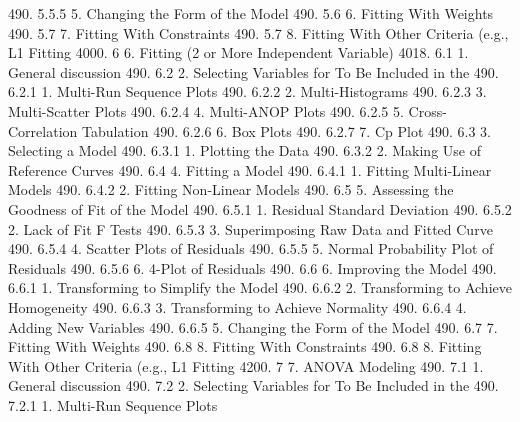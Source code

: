 490.      5.5.5                       5. Changing the Form of the Model
490.      5.6                   6. Fitting With Weights
490.      5.7                   7. Fitting With Constraints
490.      5.7                   8. Fitting With Other Criteria (e.g., L1 Fitting
4000.     6               6. Fitting (2 or More Independent Variable)
4018.     6.1                   1. General discussion
490.      6.2                   2. Selecting Variables for To Be Included in the
490.      6.2.1                       1. Multi-Run Sequence Plots
490.      6.2.2                       2. Multi-Histograms
490.      6.2.3                       3. Multi-Scatter Plots
490.      6.2.4                       4. Multi-ANOP Plots
490.      6.2.5                       5. Cross-Correlation Tabulation
490.      6.2.6                       6. Box Plots
490.      6.2.7                       7. Cp Plot
490.      6.3                   3. Selecting a Model
490.      6.3.1                       1. Plotting the Data
490.      6.3.2                       2. Making Use of Reference Curves
490.      6.4                   4. Fitting a Model
490.      6.4.1                       1. Fitting Multi-Linear Models
490.      6.4.2                       2. Fitting Non-Linear Models
490.      6.5                   5. Assessing the Goodness of Fit of the Model
490.      6.5.1                       1. Residual Standard Deviation
490.      6.5.2                       2. Lack of Fit F Tests
490.      6.5.3                       3. Superimposing Raw Data and Fitted Curve
490.      6.5.4                       4. Scatter Plots of Residuals
490.      6.5.5                       5. Normal Probability Plot of Residuals
490.      6.5.6                       6. 4-Plot of Residuals
490.      6.6                   6. Improving the Model
490.      6.6.1                       1. Transforming to Simplify the Model
490.      6.6.2                       2. Transforming to Achieve Homogeneity
490.      6.6.3                       3. Transforming to Achieve Normality
490.      6.6.4                       4. Adding New Variables
490.      6.6.5                       5. Changing the Form of the Model
490.      6.7                   7. Fitting With Weights
490.      6.8                   8. Fitting With Constraints
490.      6.8                   8. Fitting With Other Criteria (e.g., L1 Fitting
4200.     7               7. ANOVA Modeling
490.      7.1                   1. General discussion
490.      7.2                   2. Selecting Variables for To Be Included in the
490.      7.2.1                       1. Multi-Run Sequence Plots
